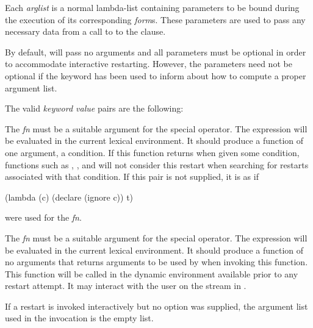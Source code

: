 \begin{defmac}
Each \emph{arglist} is a normal lambda-list containing parameters to be bound
during the execution of its corresponding \emph{form\/}s. These parameters are
used to pass any necessary data from a call to  to the
 clause.

By default,  will pass no arguments and all
parameters must be optional in order to accommodate interactive
restarting. However, the parameters need not be optional if the
 keyword has been used to inform
 about how to compute a proper argument list.

The valid \emph{keyword value} pairs are the following:
\begin{flushdesc}
\item[\cd{:test \emph{fn}}]

  The \emph{fn} must be a suitable argument for the  special
  operator. The expression  will be evaluated in the
  current lexical environment. It should produce a function of one argument, a
  condition.  If this function returns  when given some condition,
  functions such as , , and
   will not consider this restart when searching for
  restarts associated with that condition.  If this pair is not supplied, it is
  as if
\begin{lisp}
  (lambda (c) (declare (ignore c)) t)
\end{lisp}
 were used for the \emph{fn}.

\item[\cd{:interactive \emph{fn}}]

  The \emph{fn} must be a suitable argument for the  special
  operator. The expression  will be evaluated in the
  current lexical environment. It should produce a function of no arguments that
  returns arguments to be used by  when
  invoking this function. This function will be called in the dynamic
  environment available prior to any restart attempt. It may interact with the
  user on the stream in .

  If a restart is invoked interactively but no  option was
  supplied, the argument list used in the invocation is the empty list.

\item[\cd{:report \emph{exp}}]


\end{flushdesc}
\end{defmac}
